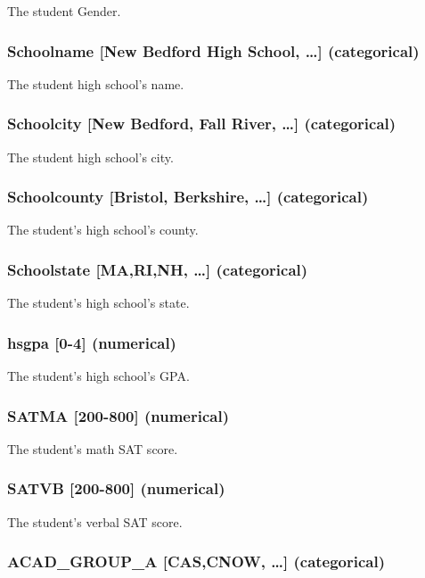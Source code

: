 \documentclass{article}
\begin{document}
The student Gender.

\subsubsection*{Schoolname [New Bedford High School, \dots] (categorical)}

The student high school's name.

\subsubsection*{Schoolcity [New Bedford, Fall River, \dots] (categorical)}

The student high school's city.

\subsubsection*{Schoolcounty [Bristol, Berkshire, \dots] (categorical)}

The student's high school's county.

\subsubsection*{Schoolstate [MA,RI,NH, \dots] (categorical)}

The student's high school's state.

\subsubsection*{hsgpa [0-4] (numerical)}

The student's high school's GPA.

\subsubsection*{SATMA [200-800] (numerical)}

The student's math SAT score.

\subsubsection*{SATVB [200-800] (numerical)}

The student's verbal SAT score.

\subsubsection*{ACAD\_GROUP\_A [CAS,CNOW, \dots] (categorical)}
\end{document}
